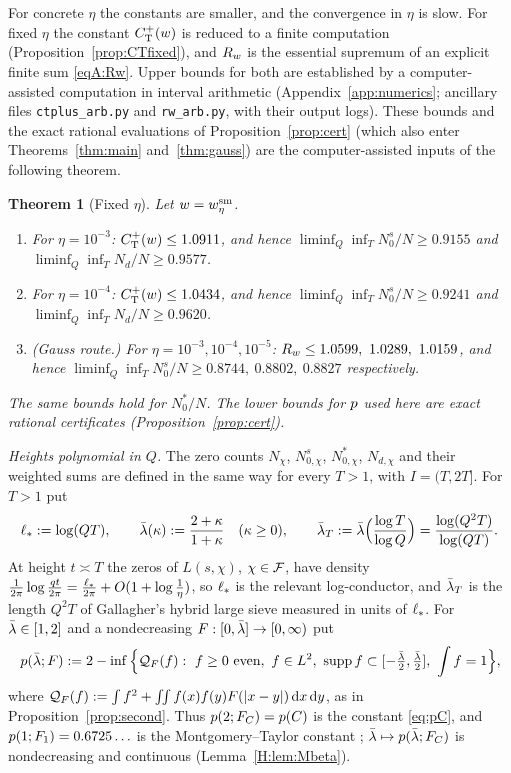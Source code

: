 \documentclass[11pt]{amsart}
\newtheorem{theorem}{Theorem}[section]
\theoremstyle{definition}
\theoremstyle{remark}
\numberwithin{equation}{section}
\begin{document}
For concrete $\eta$ the constants are smaller, and the convergence in $\eta$ is slow. For fixed $\eta$ the constant $C^{+}_{\mathrm T}(w)$ is reduced to a finite computation (Proposition~\ref{prop:CTfixed}), and $R_w$ is the essential supremum of an explicit finite sum \eqref{eqA:Rw}. Upper bounds for both are established by a computer-assisted computation in interval arithmetic (Appendix~\ref{app:numerics}; ancillary files \texttt{ctplus\_arb.py} and \texttt{rw\_arb.py}, with their output logs). These bounds and the exact rational evaluations of Proposition~\ref{prop:cert} (which also enter Theorems~\ref{thm:main} and~\ref{thm:gauss}) are the computer-assisted inputs of the following theorem.

\begin{theorem}[Fixed $\eta$]\label{thm:fixed}
Let $w=w^{\mathrm{sm}}_\eta$.
\begin{enumerate}[label=(\roman*)]
\item For $\eta=10^{-3}$: $C^{+}_{\mathrm T}(w)\le1.0911$, and hence $\liminf_{Q}\inf_TN^s_0/N\ge0.9155$ and $\liminf_Q\inf_TN_d/N\ge0.9577$.
\item For $\eta=10^{-4}$: $C^{+}_{\mathrm T}(w)\le1.0434$, and hence $\liminf_{Q}\inf_TN^s_0/N\ge0.9241$ and $\liminf_Q\inf_TN_d/N\ge0.9620$.
\item (Gauss route.) For $\eta=10^{-3},10^{-4},10^{-5}$: $R_w\le1.0599,\ 1.0289,\ 1.0159$, and hence $\liminf_Q\inf_TN^s_0/N\ge0.8744,\ 0.8802,\ 0.8827$ respectively.
\end{enumerate}
The same bounds hold for $N^*_0/N$. The lower bounds for $p$ used here are exact rational certificates (Proposition~\ref{prop:cert}).
\end{theorem}

\medskip\noindent\emph{Heights polynomial in $Q$.} The zero counts $N_\chi$, $N^s_{0,\chi}$, $N^*_{0,\chi}$, $N_{d,\chi}$ and their weighted sums are defined in the same way for every $T>1$, with $I=(T,2T]$. For $T>1$ put
\begin{equation}\label{eq:bet}
\ell_*:=\log(QT),\qquad \bar\lambda(\kappa):=\frac{2+\kappa}{1+\kappa}\quad(\kappa\ge0),\qquad \bar\lambda_T:=\bar\lambda\Big(\frac{\log T}{\log Q}\Big)=\frac{\log(Q^2T)}{\log(QT)} .
\end{equation}
At height $t\asymp T$ the zeros of $L(s,\chi)$, $\chi\in\mathcal F$, have density $\frac1{2\pi}\log\frac{qt}{2\pi}=\frac{\ell_*}{2\pi}+O(1+\log\frac1\eta)$, so $\ell_*$ is the relevant log-conductor, and $\bar\lambda_T$ is the length $Q^2T$ of Gallagher's hybrid large sieve \cite{Gal70} measured in units of $\ell_*$. For $\bar\lambda\in[1,2]$ and a nondecreasing $F:[0,\bar\lambda]\to[0,\infty)$ put
\begin{equation}\label{eq:pbeta}
p(\bar\lambda;F):=2-\inf\Big\{\mathcal Q_F(f):\ f\ge0\text{ even},\ f\in L^2,\ \operatorname{supp} f\subset[-\tfrac{\bar\lambda}2,\tfrac{\bar\lambda}2],\ \int f=1\Big\},
\end{equation}
where $\mathcal Q_F(f):=\int f^2+\iint f(x)f(y)F(|x-y|)\,\mathrm d x\,\mathrm d y$, as in Proposition~\ref{prop:second}. Thus $p(2;F_C)=p(C)$ is the constant \eqref{eq:pC}, and $p(1;F_1)=0.6725\ldots$ is the Montgomery--Taylor constant \cite{Mon73,Mon75}; $\bar\lambda\mapsto p(\bar\lambda;F_C)$ is nondecreasing and continuous (Lemma~\ref{H:lem:Mbeta}).
\end{document}

